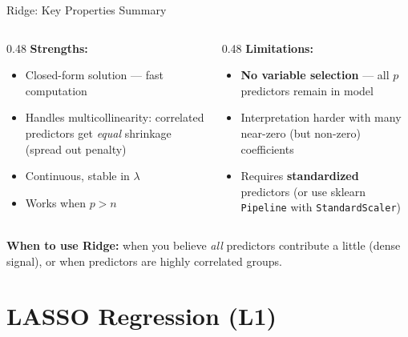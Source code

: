 \documentclass[aspectratio=169, 10pt]{beamer}
\begin{document}
\begin{frame}{Ridge: Key Properties Summary}
  \begin{columns}[T]
    \begin{column}{0.48\textwidth}
      \textbf{Strengths:}
      \begin{itemize}
        \item Closed-form solution — fast computation
        \item Handles multicollinearity: correlated predictors get
              \emph{equal} shrinkage (spread out penalty)
        \item Continuous, stable in $\lambda$
        \item Works when $p > n$
      \end{itemize}
    \end{column}
    \begin{column}{0.48\textwidth}
      \textbf{Limitations:}
      \begin{itemize}
        \item \textbf{No variable selection} — all $p$ predictors remain in model
        \item Interpretation harder with many near-zero (but non-zero) coefficients
        \item Requires \textbf{standardized} predictors (or use sklearn
              \texttt{Pipeline} with \texttt{StandardScaler})
      \end{itemize}
    \end{column}
  \end{columns}

  \medskip
  \begin{keybox}
    \textbf{When to use Ridge:} when you believe \emph{all} predictors contribute
    a little (dense signal), or when predictors are highly correlated groups.
  \end{keybox}
\end{frame}

\section{LASSO Regression (L1)}

\end{document}
